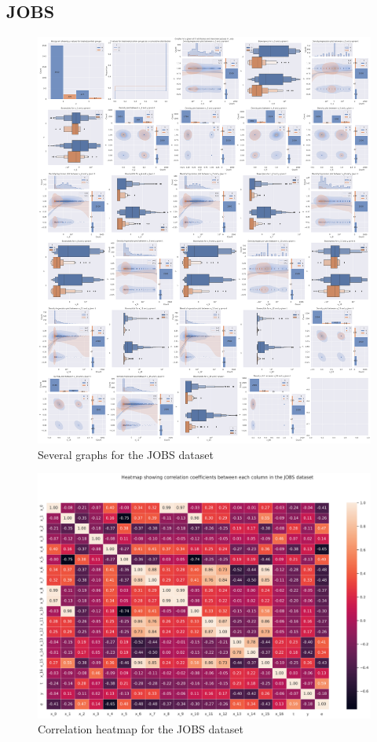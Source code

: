 \documentclass{article}
\begin{document}
\subsection{JOBS}

\begin{figure}[tb]
\centering
\includegraphics[width=1\textwidth]{project/data/jobs_graphs.pdf}
\caption{\label{fig:jobsgraphs}Several graphs for the JOBS dataset}
\end{figure}


\begin{figure}[tb]
\centering
\includegraphics[width=1\textwidth]{project/data/jobs_heatmap.pdf}
\caption{\label{fig:jobs_correlation}Correlation heatmap for the JOBS dataset}
\end{figure}
\end{document}

